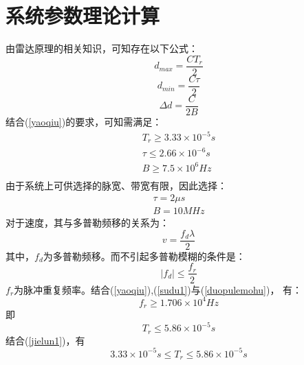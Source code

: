 \documentclass[12pt]{article}
\begin{document}
\section{系统参数理论计算}
\setcounter{table}{0}\setcounter{figure}{0}\setcounter{equation}{0}
由雷达原理的相关知识，可知存在以下公式：
\begin{equation}\label{zuidazhi1}
d_{max}=\frac{CT_r}{2}
\end{equation}
\begin{equation}\label{zuixiaozhi1}
d_{min}=\frac{C\tau}{2}
\end{equation}
\begin{equation}\label{julifenbianlv1}
\Delta d=\frac{C}{2B}
\end{equation}
结合(\ref{yaoqiu})的要求，可知需满足：
\begin{equation}\label{jielun1}
  \begin{array}{c}
    T_r\geq 3.33\times 10^{-5}s\\
    \tau\leq 2.66\times 10^{-6}s\\
    B\geq 7.5\times 10^{6}Hz\\
  \end{array}
\end{equation}
由于系统上可供选择的脉宽、带宽有限，因此选择：
\begin{equation}\label{zuizhongjielun1}
\begin{array}{c}
  \tau=2\mu s\\
  B=10MHz
\end{array}
\end{equation}
对于速度，其与多普勒频移的关系为：
\begin{equation}\label{sudu1}
v=\frac{f_d\lambda}{2}
\end{equation}
其中，$f_d$为多普勒频移。而不引起多普勒模糊的条件是：
\begin{equation}\label{duopulemohu}
  |f_d|\leq \frac{f_r}{2}
\end{equation}
$f_r$为脉冲重复频率。结合(\ref{yaoqiu}),(\ref{sudu1})与(\ref{duopulemohu})，   有：
\begin{equation}\label{maichongchongfupinlv}
f_r\geq 1.706\times 10^4 Hz
\end{equation}
即
\begin{equation}\label{maichongchongfuzhouqi}
T_r\leq 5.86\times 10^{-5} s
\end{equation}
结合(\ref{jielun1})，有
\begin{equation}\label{jielun2}
3.33\times 10^{-5}s \leq T_r\leq 5.86\times 10^{-5} s
\end{equation}
\end{document}
